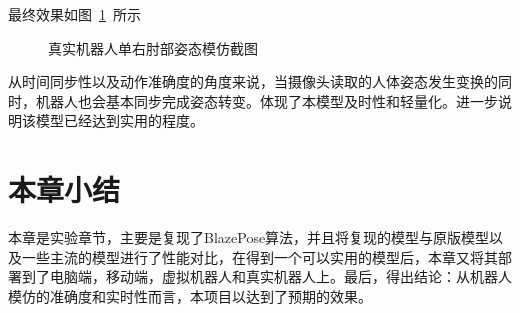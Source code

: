 最终效果如图~\ref{picture:26}~所示
\begin{figure}[!h]
\setlength{\subfigcapskip}{-1bp}
\centering
\begin{minipage}{\textwidth}
\centering
{}
\end{minipage}
\begin{minipage}{\textwidth}
\centering
{}
\end{minipage}
\begin{minipage}{\textwidth}
\centering
{}
\end{minipage}
\begin{minipage}{\textwidth}
\centering

\end{minipage}
\vspace{0.2em}
\caption{真实机器人单右肘部姿态模仿截图}
\label{picture:26}
\end{figure}

从时间同步性以及动作准确度的角度来说，当摄像头读取的人体姿态发生变换的同时，机器人也会基本同步完成姿态转变。体现了本模型及时性和轻量化。进一步说明该模型已经达到实用的程度。

\section{本章小结}
本章是实验章节，主要是复现了BlazePose算法，并且将复现的模型与原版模型以及一些主流的模型进行了性能对比，在得到一个可以实用的模型后，本章又将其部署到了电脑端，移动端，虚拟机器人和真实机器人上。最后，得出结论：从机器人模仿的准确度和实时性而言，本项目以达到了预期的效果。


